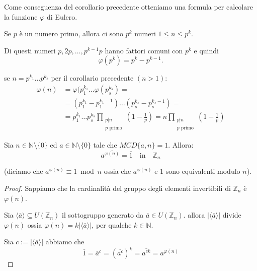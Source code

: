 \documentclass[../main.tex]{subfiles}
\begin{document}
Come conseguenza del corollario precedente otteniamo una formula per calcolare la funzione $\varphi$ di Eulero.

Se $p$ è un numero primo, allora ci sono $p^k$ numeri $1 \leq n \leq p^k$.

Di questi numeri $p, 2p, \ldots , p^{k-1}p$ hanno fattori comuni con $p^k$ e quindi
\begin{equation*}
    \varphi(p^k) = p^k - p^{k-1}.
\end{equation*}

se $n = p^{k_1}\ldots p^{k_s}$ per il corollario precedente $(n>1)$:
\begin{align*}
    \varphi(n) & = \varphi(p_1^{k_1}\ldots\varphi(p_s^{k_s}) =            \\
               & = (p_1^{k_1}-p_1^{k_1-1})\ldots(p_s^{k_s}-p_s^{k_s-1}) = \\
               & = p_1^{k_1} \ldots p_s^{k_s}\prod_{\substack{p|n         \\ p \text{ primo}}}\left(1-\frac{1}{p}\right) = n \prod_{\substack{p|n \\ p \text{ primo}}}\left(1-\frac{1}{p}\right)
\end{align*}

\begin{theorem}[di Eulero]
    Sia $n \in \mathbb{N} \setminus \{0\}$ ed $a \in \mathbb{N} \setminus \{0\}$ tale che $MCD\{a,n\} = 1$. Allora:
    \begin{equation*}
        a^{\overline{\varphi(n)}} = \overline{1} \quad \text{in} \quad \mathbb{Z}_n
    \end{equation*}

    (diciamo che $a^{\varphi(n)} \equiv 1 \bmod n$ ossia che $a^{\varphi(n)}$ e 1 sono equivalenti modulo $n$).
\end{theorem}

\begin{proof}
    Sappiamo che la cardinalità del gruppo degli elementi invertibili di $\mathbb{Z}_n$ è $\varphi(n)$.

    Sia $\langle\overline{a}\rangle \subseteq U(\mathbb{Z}_n)$ il sottogruppo generato da $\overline{a} \in U(\mathbb{Z}_n)$. allora $|\langle\overline{a}\rangle|$ divide $\varphi(n)$ ossia $\varphi(n) = k |\langle\overline{a}\rangle|$, per qualche $k \in \mathbb{N}$.

    Sia $c := |\langle\overline{a}\rangle|$ abbiamo che
    \begin{equation*}
        \overline{1} = \overline{a}^c = (\overline{a^c})^k = \overline{a^{ck}} = \overline{a^{\varphi(n)}}
    \end{equation*}
\end{proof}
\end{document}
